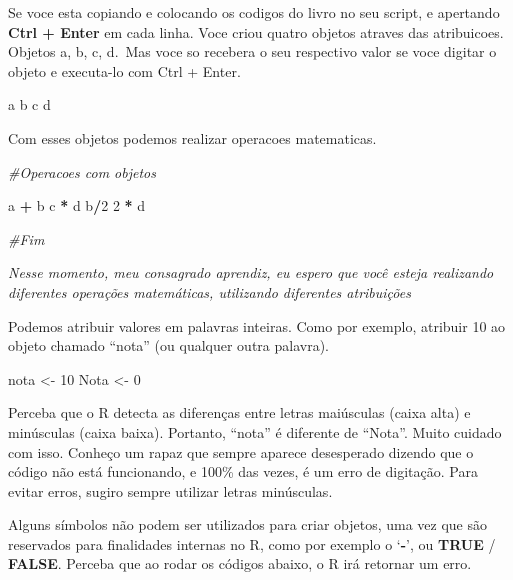 \documentclass[
]{book}
\newenvironment{Shaded}{\begin{snugshade}}{\end{snugshade}}
\newcommand{\CommentTok}[1]{\textcolor[rgb]{0.56,0.35,0.01}{\textit{#1}}}
\newcommand{\DecValTok}[1]{\textcolor[rgb]{0.00,0.00,0.81}{#1}}
\newcommand{\NormalTok}[1]{#1}
\newcommand{\OtherTok}[1]{\textcolor[rgb]{0.56,0.35,0.01}{#1}}
\newcommand{\SpecialCharTok}[1]{\textcolor[rgb]{0.81,0.36,0.00}{\textbf{#1}}}
\begin{document}
Se voce esta copiando e colocando os codigos do livro no seu script, e apertando \textbf{Ctrl + Enter} em cada linha. Voce criou quatro objetos atraves das atribuicoes. Objetos a, b, c, d.~Mas voce so recebera o seu respectivo valor se voce digitar o objeto e executa-lo com Ctrl + Enter.

\begin{Shaded}
\begin{Highlighting}[]
\NormalTok{a}
\NormalTok{b}
\NormalTok{c}
\NormalTok{d}
\end{Highlighting}
\end{Shaded}

Com esses objetos podemos realizar operacoes matematicas.

\begin{Shaded}
\begin{Highlighting}[]
\CommentTok{\#Operacoes com objetos}

\NormalTok{a }\SpecialCharTok{+}\NormalTok{ b}
\NormalTok{c }\SpecialCharTok{*}\NormalTok{ d}
\NormalTok{b}\SpecialCharTok{/}\DecValTok{2}
\DecValTok{2} \SpecialCharTok{*}\NormalTok{ d}

\CommentTok{\#Fim}
\end{Highlighting}
\end{Shaded}

\emph{Nesse momento, meu consagrado aprendiz, eu espero que você esteja realizando diferentes operações matemáticas, utilizando diferentes atribuições}

Podemos atribuir valores em palavras inteiras. Como por exemplo, atribuir 10 ao objeto chamado ``nota'' (ou qualquer outra palavra).

\begin{Shaded}
\begin{Highlighting}[]
\NormalTok{nota }\OtherTok{\textless{}{-}} \DecValTok{10}
\NormalTok{Nota }\OtherTok{\textless{}{-}} \DecValTok{0}
\end{Highlighting}
\end{Shaded}

Perceba que o R detecta as diferenças entre letras maiúsculas (caixa alta) e minúsculas (caixa baixa). Portanto, ``nota'' é diferente de ``Nota''. Muito cuidado com isso. Conheço um rapaz que sempre aparece desesperado dizendo que o código não está funcionando, e 100\% das vezes, é um erro de digitação. Para evitar erros, sugiro sempre utilizar letras minúsculas.

Alguns símbolos não podem ser utilizados para criar objetos, uma vez que são reservados para finalidades internas no R, como por exemplo o `\textbf{-}', ou \textbf{TRUE} / \textbf{FALSE}. Perceba que ao rodar os códigos abaixo, o R irá retornar um erro.
\end{document}
